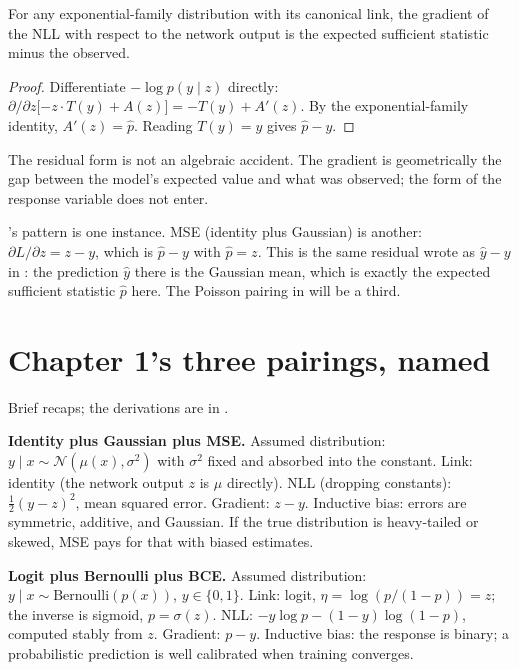 \begin{theorem}\label{thm:canonical-link}
For any exponential-family distribution with its canonical link, the
gradient of the NLL with respect to the network output is the expected
sufficient statistic minus the observed.
\end{theorem}

\begin{proof}
Differentiate $-\log p(y \mid z)$ directly:
$\partial / \partial z \bigl[{-z \cdot T(y) + A(z)}\bigr] = -T(y) + A'(z)$.
By the exponential-family identity, $A'(z) = \hat{p}$. Reading
$T(y) = y$ gives $\hat{p} - y$.
\end{proof}

\noindent The residual form is not an algebraic accident. The gradient is
geometrically the gap between the model's expected value and what was
observed; the form of the response variable does not enter.

's pattern is one instance. MSE (identity plus
Gaussian) is another: $\partial L / \partial z = z - y$, which is
$\hat{p} - y$ with $\hat{p} = z$. This is the same residual
 wrote as $\hat{y} - y$ in : the
prediction $\hat{y}$ there is the Gaussian mean, which is exactly the
expected sufficient statistic $\hat{p}$ here. The Poisson pairing in
 will be a third.

\section{Chapter 1's three pairings, named}\label{sec:three-pairings}

Brief recaps; the derivations are in .

\textbf{Identity plus Gaussian plus MSE.} Assumed distribution:
$y \mid x \sim \mathcal{N}(\mu(x), \sigma^2)$ with $\sigma^2$ fixed
and absorbed into the constant. Link: identity (the network output $z$
is $\mu$ directly). NLL (dropping constants): $\tfrac{1}{2}(y - z)^2$,
mean squared error. Gradient: $z - y$. Inductive bias: errors are
symmetric, additive, and Gaussian. If the true distribution is
heavy-tailed or skewed, MSE pays for that with biased estimates.

\textbf{Logit plus Bernoulli plus BCE.} Assumed distribution:
$y \mid x \sim \mathrm{Bernoulli}(p(x))$, $y \in \{0, 1\}$. Link:
logit, $\eta = \log(p/(1-p)) = z$; the inverse is sigmoid,
$p = \sigma(z)$. NLL: $-y \log p - (1-y)\log(1-p)$, computed stably
from $z$. Gradient: $p - y$. Inductive bias: the response is binary; a
probabilistic prediction is well calibrated when training converges.

